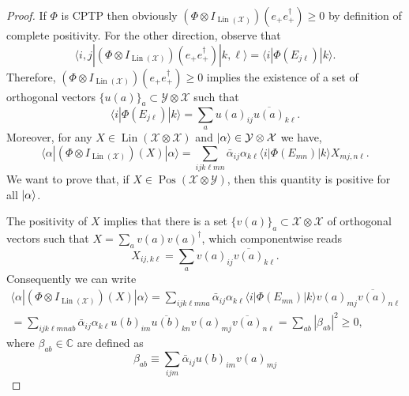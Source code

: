 \documentclass[12pt]{report}
\newcommand{\CC}{\mathbb{C}}
\newcommand{\calY}{{\mathcal{Y}}}
\newcommand{\calX}{{\mathcal{X}}}
\DeclareMathOperator{\Pos}{Pos}
\DeclareMathOperator{\Lin}{Lin}
\begin{document}
\begin{proof}
	If $\Phi$ is CPTP then obviously $(\Phi\otimes I_{\Lin(\calX)})(e_+ e_+^\dagger)\ge0$ by definition of complete positivity.
	For the other direction, observe that
	\begin{equation}
		\langle i,j| (\Phi\otimes I_{\Lin(\calX)})(e_+ e_+^\dagger) |k,\ell\rangle
		= \langle i | \Phi(E_{j\ell}) | k\rangle.
	\end{equation}
	Therefore, $(\Phi\otimes I_{\Lin(\calX)})(e_+ e_+^\dagger)\ge0$ implies the existence of a set of orthogonal vectors $\{u(a)\}_a\subset\calY\otimes\calX$ such that
	\begin{equation}
		\langle i|\Phi(E_{j\ell})|k\rangle
		= \sum_a u(a)_{ij} \overline{u(a)}_{k\ell}.
	\end{equation}
	Moreover, for any $X\in\Lin(\calX\otimes\calX)$ and $\ket\alpha\in \calY\otimes\calX$ we have,
	\begin{equation}
		\langle \alpha| (\Phi\otimes I_{\Lin(\calX)})(X) |\alpha\rangle
		= \sum_{ijk\ell mn}
		\bar\alpha_{ij} \alpha_{k\ell}
		\langle i|\Phi(E_{mn})|k\rangle X_{mj,n\ell}.
	\end{equation}
	We want to prove that, if $X\in\Pos(\calX\otimes\calY)$, then this quantity is positive for all $\ket\alpha$.

	The positivity of $X$ implies that there is a set $\{v(a)\}_a\subset\calX\otimes\calX$ of orthogonal vectors such that
	$X = \sum_a v(a) v(a)^\dagger$, which componentwise reads
	\begin{equation}
		X_{ij,k\ell} = \sum_a v(a)_{ij} \overline{v(a)}_{k\ell}.
	\end{equation}
	Consequently we can write
	\begin{equation}
	\begin{gathered}
		\langle \alpha| (\Phi\otimes I_{\Lin(\calX)})(X) |\alpha\rangle
		= \sum_{ijk\ell mn a} \bar\alpha_{ij} \alpha_{k\ell}
		\langle i|\Phi(E_{mn})|k\rangle v(a)_{mj} \overline{v(a)}_{n\ell} \\
		= \sum_{ijk\ell mn ab}
		\bar\alpha_{ij} \alpha_{k\ell}
		u(b)_{im} \overline{u(b)}_{kn}
		v(a)_{mj} \overline{v(a)}_{n\ell}
		= \sum_{ab} |\beta_{ab}|^2 \ge 0,
	\end{gathered}
	\end{equation}
	where $\beta_{ab}\in\CC$ are defined as
	\begin{equation}
		\beta_{ab} \equiv \sum_{ijm}
		\bar\alpha_{ij} u(b)_{im} v(a)_{mj}
	\end{equation}
\end{proof}
\end{document}

